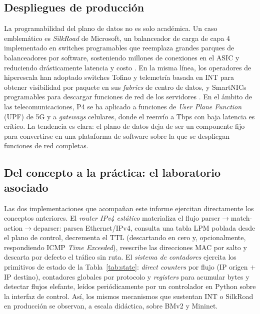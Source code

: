 \documentclass[conference,onecolumn,10pt]{IEEEtran}
\begin{document}
\subsection{Despliegues de producción}
La programabilidad del plano de datos no es solo académica. Un caso emblemático
es \emph{SilkRoad} de Microsoft, un balanceador de carga de capa 4 implementado
en switches programables que reemplaza grandes parques de balanceadores por
software, sosteniendo millones de conexiones en el ASIC y reduciendo
drásticamente latencia y costo \cite{miao2017silkroad}. En la misma línea, los
operadores de hiperescala han adoptado switches Tofino y telemetría basada en
INT para obtener visibilidad por paquete en sus \emph{fabrics} de centro de
datos, y SmartNICs programables para descargar funciones de red de los
servidores \cite{bosshart2013rmt, int_spec}. En el ámbito de las
telecomunicaciones, P4 se ha aplicado a funciones de \emph{User Plane Function}
(UPF) de 5G y a \emph{gateways} celulares, donde el reenvío a Tbps con baja
latencia es crítico. La tendencia es clara: el plano de datos deja de ser un
componente fijo para convertirse en una plataforma de software sobre la que se
despliegan funciones de red completas.

\subsection{Del concepto a la práctica: el laboratorio asociado}
Las dos implementaciones que acompañan este informe ejercitan directamente los
conceptos anteriores. El \emph{router IPv4 estático} materializa el flujo
parser$\rightarrow$match-action$\rightarrow$deparser: parsea Ethernet/IPv4,
consulta una tabla LPM poblada desde el plano de control, decrementa el TTL
(descartando en cero y, opcionalmente, respondiendo ICMP \emph{Time Exceeded}),
reescribe las direcciones MAC por salto y descarta por defecto el tráfico sin
ruta. El \emph{sistema de contadores} ejercita los primitivos de estado de la
Tabla~\ref{tab:state}: \emph{direct counters} por flujo (IP origen $+$ IP
destino), contadores globales por protocolo y \emph{registers} para acumular
bytes y detectar flujos elefante, leídos periódicamente por un controlador en
Python sobre la interfaz de control. Así, los mismos mecanismos que sustentan INT
o SilkRoad en producción se observan, a escala didáctica, sobre BMv2 y Mininet.
\end{document}
